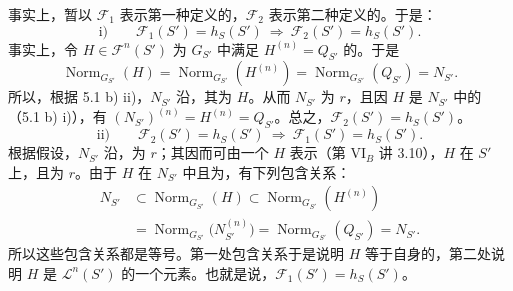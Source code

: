 事实上，暂以 $\mathscr F_1$ 表示第一种定义的，$\mathscr F_2$ 表示第二种定义的。于是：
\[\text{i)}\qquad\mathscr F_1(S')=h_S(S')\ \Longrightarrow\ \mathscr F_2(S')=h_S(S').\]
事实上，令 $H\in\mathscr F^n(S')$ 为 $G_{S'}$ 中满足 $H^{(n)}=Q_{S'}$ 的。于是
\[\operatorname{Norm}_{G_{S'}}(H)=\operatorname{Norm}_{G_{S'}}(H^{(n)})=\operatorname{Norm}_{G_{S'}}(Q_{S'})=N_{S'}.\]
所以，根据 5.1 b) ii)，$N_{S'}$ 沿，其为 $H$。从而 $N_{S'}$ 为 $r$，且因 $H$ 是 $N_{S'}$ 中的（5.1 b) i)），有 $(N_{S'})^{(n)}=H^{(n)}=Q_{S'}$。总之，$\mathscr F_2(S')=h_S(S')$。
\[\text{ii)}\qquad\mathscr F_2(S')=h_S(S')\ \Longrightarrow\ \mathscr F_1(S')=h_S(S').\]
根据假设，$N_{S'}$ 沿，为 $r$；其因而可由一个 $H$ 表示（第 VI$_B$ 讲 3.10），$H$ 在 $S'$ 上，且为 $r$。由于 $H$ 在 $N_{S'}$ 中且为，有下列包含关系：
\begin{align*}
N_{S'}&\subset\operatorname{Norm}_{G_{S'}}(H)\subset\operatorname{Norm}_{G_{S'}}(H^{(n)})\\
&=\operatorname{Norm}_{G_{S'}}\bigl(N_{S'}^{(n)}\bigr)=\operatorname{Norm}_{G_{S'}}(Q_{S'})=N_{S'}.
\end{align*}
所以这些包含关系都是等号。第一处包含关系于是说明 $H$ 等于自身的，第二处说明 $H$ 是 $\mathscr L^n(S')$ 的一个元素。也就是说，$\mathscr F_1(S')=h_S(S')$。

